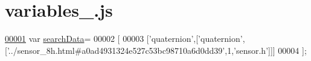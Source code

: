 \hypertarget{variables__10_8js_source}{}\section{variables\+\_.\+js}
\label{variables__10_8js_source}

\begin{DoxyCode}
\hypertarget{variables__10_8js_source.tex_l00001}{}\hyperlink{variables__10_8js_ad01a7523f103d6242ef9b0451861231e}{00001} var \hyperlink{variables__10_8js_ad01a7523f103d6242ef9b0451861231e}{searchData}=
00002 [
00003   [\textcolor{stringliteral}{'quaternion'},[\textcolor{stringliteral}{'quaternion'},[\textcolor{stringliteral}{'../sensor\_8h.html#a0ad4931324e527c53bc98710a6d0dd39'},1,\textcolor{stringliteral}{'sensor.h'}]]]
00004 ];
\end{DoxyCode}
